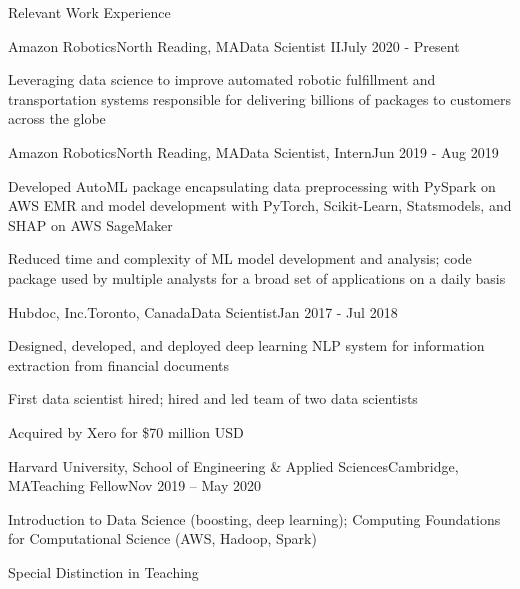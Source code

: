 \documentclass{resume} %
\begin{document}
\begin{rSection}{Relevant Work Experience}


\begin{rSubsection}{Amazon Robotics}{North Reading, MA}{Data Scientist II}{July 2020 - Present}

	\item Leveraging data science to improve automated robotic fulfillment and transportation systems responsible for delivering billions of packages to customers across the globe
    
\end{rSubsection}

\begin{rSubsection}{Amazon Robotics}{North Reading, MA}{Data Scientist, Intern}{Jun 2019 - Aug 2019}

	\item Developed AutoML package encapsulating data preprocessing with PySpark on AWS EMR and model development with PyTorch, Scikit-Learn, Statsmodels, and SHAP on AWS SageMaker
	\item Reduced time and complexity of ML model development and analysis; code package used by multiple analysts for a broad set of applications on a daily basis
    
\end{rSubsection}


\begin{rSubsection}{Hubdoc, Inc.}{Toronto, Canada}{Data Scientist}{Jan 2017 - Jul 2018}

	\item Designed, developed, and deployed deep learning NLP system for information extraction from financial documents
	\item First data scientist hired; hired and led team of two data scientists
	\item Acquired by Xero for \$70 million USD
	    
\end{rSubsection}


\begin{rSubsection}{Harvard University, School of Engineering \& Applied Sciences}{Cambridge, MA}{Teaching Fellow}{Nov 2019 -- May 2020}

\item Introduction to Data Science (boosting, deep learning); Computing Foundations for Computational Science (AWS, Hadoop, Spark)
\item Special Distinction in Teaching
    
\end{rSubsection}


\end{rSection}
\end{document}
